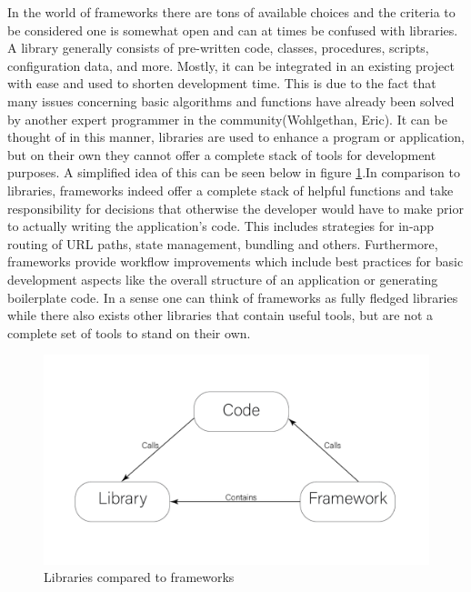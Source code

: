 \documentclass[11pt]{article}
\begin{document}
In the world of frameworks there are tons of available choices and the criteria to be considered one is somewhat open and can at times
be confused with libraries. A library generally consists of pre-written code, classes, procedures, scripts, configuration data, and more.
Mostly, it can be integrated in an existing project with ease and used to shorten development time. This is due to the fact that many 
issues concerning basic algorithms and functions have already been solved by another expert programmer in the community(Wohlgethan, Eric)\cite{wohlgethan2018supportingweb}.
It can be thought of in this manner, libraries are used to enhance a program or application, but on their own they cannot offer a complete 
stack of tools for development purposes. A simplified idea of this can be seen below in figure \ref{fig:1}.In comparison to libraries, 
frameworks indeed offer a complete stack of helpful functions and take responsibility for decisions that otherwise the developer
would have to make prior to actually writing the application’s code. This includes strategies for in-app routing of URL paths, 
state management, bundling and others. Furthermore, frameworks provide workflow improvements which include best practices
for basic development aspects like the overall structure of an application or generating boilerplate code. In a sense one can think of
frameworks as fully fledged libraries while there also exists other libraries that contain useful tools, but are not a complete 
set of tools to stand on their own. 

\begin{figure}[h]
    \centering
    \includegraphics{flowchart}
    \caption{Libraries compared to frameworks}
    \label{fig:1}
\end{figure}    
\end{document}
